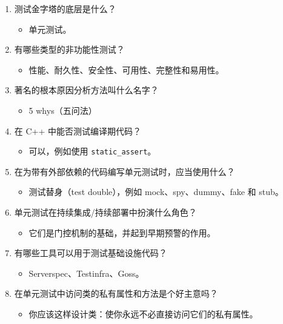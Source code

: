 \begin{enumerate}
\item 测试金字塔的底层是什么？

\begin{itemize}
\item 单元测试。
\end{itemize}
\item 有哪些类型的非功能性测试？

\begin{itemize}
\item 性能、耐久性、安全性、可用性、完整性和易用性。
\end{itemize}
\item 著名的根本原因分析方法叫什么名字？

\begin{itemize}
\item 5 whys（五问法）
\end{itemize}
\item 在 C++ 中能否测试编译期代码？

\begin{itemize}
\item 可以，例如使用 \texttt{static\_\allowbreak{}assert}。
\end{itemize}
\item 在为带有外部依赖的代码编写单元测试时，应当使用什么？

\begin{itemize}
\item 测试替身（test double），例如 mock、spy、dummy、fake 和 stub。
\end{itemize}
\item 单元测试在持续集成/持续部署中扮演什么角色？

\begin{itemize}
\item 它们是门控机制的基础，并起到早期预警的作用。
\end{itemize}
\item 有哪些工具可以用于测试基础设施代码？

\begin{itemize}
\item Serverspec、Testinfra、Goss。
\end{itemize}
\item 在单元测试中访问类的私有属性和方法是个好主意吗？

\begin{itemize}
\item 你应该这样设计类：使你永远不必直接访问它们的私有属性。
\end{itemize}
\end{enumerate}

